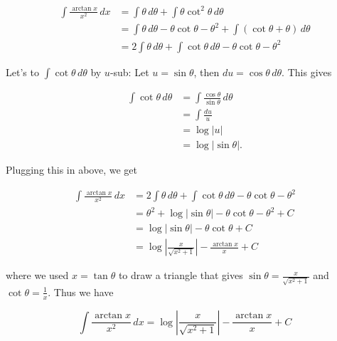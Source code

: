 \documentclass[12pt, letterpaper]{article}
\begin{document}
\begin{equation*}
\begin{aligned}
\int \frac{\arctan{x}}{x^2} \, dx
  &= \int \theta \, d\theta + \int \theta \cot^2{\theta} \, d\theta \\[0.2in]
  &= \int \theta \, d\theta - \theta \cot{\theta} - \theta^2 + \int \left( \cot{\theta} + \theta \right) \, d\theta \\[0.2in]
  &= 2\int \theta \, d\theta + \int \cot{\theta}\, d\theta - \theta \cot{\theta} - \theta^2
\end{aligned}
\end{equation*}

Let's to $\int \cot{\theta}\, d\theta$ by $u$-sub: Let $u = \sin{\theta}$, then $du = \cos{\theta} \, d\theta$. This gives

\begin{equation*}
\begin{aligned}
\int \cot{\theta}\, d\theta
  &= \int \frac{\cos{\theta}}{\sin{\theta}} \, d\theta \\[0.2in]
  &= \int \frac{du}{u} \\[0.2in]
  &= \log{\left| u \right|} \\[0.2in]
  &= \log{\left| \sin{\theta} \right|}.
\end{aligned}
\end{equation*}

Plugging this in above, we get

\begin{equation*}
\begin{aligned}
\int \frac{\arctan{x}}{x^2} \, dx
  &= 2\int \theta \, d\theta + \int \cot{\theta}\, d\theta - \theta \cot{\theta} - \theta^2 \\[0.2in]
  &= \theta^2 + \log{|\sin{\theta}|} - \theta \cot{\theta} - \theta^2 + C \\[0.2in]
  &= \log{|\sin{\theta}|} - \theta \cot{\theta} + C \\[0.2in]
  &= \log{\left| \frac{x}{\sqrt{x^2 + 1}} \right|} - \frac{\arctan{x}}{x} + C
\end{aligned}
\end{equation*}

where we used $x = \tan{\theta}$ to draw a triangle that gives $\sin{\theta} = \frac{x}{\sqrt{x^2 + 1}}$ and $\cot{\theta} = \frac{1}{x}$. Thus we have

\begin{equation*}
\boxed
{
\int \frac{\arctan{x}}{x^2} \, dx
  = \log{\left| \frac{x}{\sqrt{x^2 + 1}} \right|} - \frac{\arctan{x}}{x} + C
}
\end{equation*}
\end{document}
